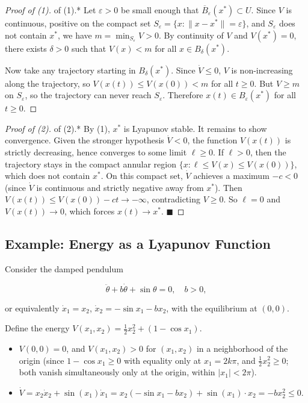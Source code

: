 \begin{proof}[Proof of (1)]
of (1).* Let $\varepsilon > 0$ be small enough that $\overline{B}_\varepsilon(x^*) \subset U$. Since $V$ is continuous, positive on the compact set $S_\varepsilon = \{x : \|x - x^*\| = \varepsilon\}$, and $S_\varepsilon$ does not contain $x^*$, we have $m = \min_{S_\varepsilon} V > 0$. By continuity of $V$ and $V(x^*) = 0$, there exists $\delta > 0$ such that $V(x) < m$ for all $x \in B_\delta(x^*)$.

Now take any trajectory starting in $B_\delta(x^*)$. Since $\dot{V} \leq 0$, $V$ is non-increasing along the trajectory, so $V(x(t)) \leq V(x(0)) < m$ for all $t \geq 0$. But $V \geq m$ on $S_\varepsilon$, so the trajectory can never reach $S_\varepsilon$. Therefore $x(t) \in B_\varepsilon(x^*)$ for all $t \geq 0$.
\end{proof}


\begin{proof}[Proof of (2)]
of (2).* By (1), $x^*$ is Lyapunov stable. It remains to show convergence. Given the stronger hypothesis $\dot{V} < 0$, the function $V(x(t))$ is strictly decreasing, hence converges to some limit $\ell \geq 0$. If $\ell > 0$, then the trajectory stays in the compact annular region $\{x : \ell \leq V(x) \leq V(x(0))\}$, which does not contain $x^*$. On this compact set, $\dot{V}$ achieves a maximum $-c < 0$ (since $\dot{V}$ is continuous and strictly negative away from $x^*$). Then $V(x(t)) \leq V(x(0)) - ct \to -\infty$, contradicting $V \geq 0$. So $\ell = 0$ and $V(x(t)) \to 0$, which forces $x(t) \to x^*$. $\blacksquare$

\end{proof}

\subsection{Example: Energy as a Lyapunov Function}\label{sec:3.7.2}

Consider the damped pendulum

\[
\ddot{\theta} + b\dot{\theta} + \sin\theta = 0, \quad b > 0,
\]

or equivalently $\dot{x}_1 = x_2$, $\dot{x}_2 = -\sin x_1 - b x_2$, with the equilibrium at $(0,0)$.

Define the energy $V(x_1, x_2) = \frac{1}{2}x_2^2 + (1 - \cos x_1)$.

\begin{itemize}[nosep]
  \item $V(0,0) = 0$, and $V(x_1, x_2) > 0$ for $(x_1, x_2)$ in a neighborhood of the origin (since $1 - \cos x_1 \geq 0$ with equality only at $x_1 = 2k\pi$, and $\frac{1}{2}x_2^2 \geq 0$; both vanish simultaneously only at the origin, within $|x_1| < 2\pi$).

  \item $\dot{V} = x_2 \dot{x}_2 + \sin(x_1)\dot{x}_1 = x_2(-\sin x_1 - bx_2) + \sin(x_1) \cdot x_2 = -bx_2^2 \leq 0$.
\end{itemize}

